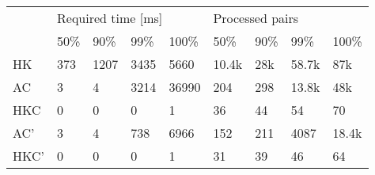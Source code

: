 \begin{tabular}{l|llll|llll}
\multirow{2}{*}{} & \multicolumn{4}{l|}{Required time {[}ms{]}} & \multicolumn{4}{l}{Processed pairs} \\ \cline{2-9}
                  & 50\% & 90\%  & 99\% & 100\%                 & 50\%    & 90\%   & 99\%    & 100\%  \\ \hline
HK                & 373  & 1207  & 3435 & 5660                  & 10.4k   & 28k    & 58.7k   & 87k    \\
AC                & 3    & 4     & 3214 & 36990                 & 204     & 298    & 13.8k   & 48k    \\
HKC               & 0    & 0     & 0    & 1                     & 36      & 44     & 54      & 70     \\
AC'               & 3    & 4     & 738  & 6966                  & 152     & 211    & 4087    & 18.4k  \\
HKC'              & 0    & 0     & 0    & 1                     & 31      & 39     & 46      & 64
\end{tabular}
